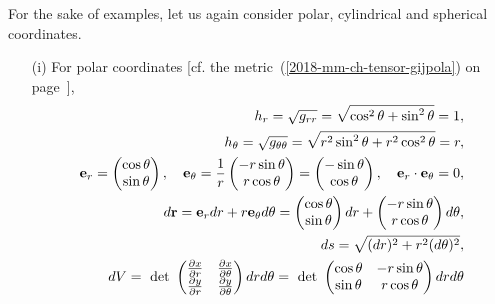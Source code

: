 {
\color{blue}
\bexample
For the sake of examples, let us again consider polar, cylindrical and spherical coordinates.
\begin{itemize}
\item[(i)]
For polar coordinates [cf. the metric~(\ref{2018-mm-ch-tensor-gijpola}) on page~\pageref{2018-mm-ch-tensor-gijpola}],
\begin{equation}
\begin{split}
h_r=\sqrt{g_{rr}}=\sqrt{ \cos^2\theta + \sin^2 \theta }=1,\\
h_\theta=\sqrt{g_{\theta \theta}}=\sqrt{ r^2 \sin^2\theta + r^2 \cos^2 \theta }=r, \\
{\bf e}_r =
\begin{pmatrix}
\cos \theta \\ \sin \theta
\end{pmatrix}
,\quad
{\bf e}_\theta = \frac{1}{r}
\begin{pmatrix}
- r \sin \theta \\ r \cos \theta
\end{pmatrix}
=
\begin{pmatrix}
- \sin \theta \\ \cos \theta
\end{pmatrix}
,\quad
{\bf e}_r \cdot {\bf e}_\theta = 0
,
\\
d{\bf r}= {\bf e}_r dr + r {\bf e}_\theta d \theta
=  \begin{pmatrix}
\cos \theta \\ \sin \theta
\end{pmatrix}  dr
+
\begin{pmatrix}
- r\sin \theta \\ r\cos \theta
\end{pmatrix} d \theta ,
\\
ds= \sqrt{ (dr)^2+ r^2 (d \theta )^2},
\\
dV
=\text{ det }
\begin{pmatrix}
\frac{\partial x}{\partial r} & \frac{\partial x}{\partial \theta} \\
\frac{\partial y}{\partial r} & \frac{\partial y}{\partial \theta} \\
\end{pmatrix}
dr d \theta
=\text{ det }
\begin{pmatrix}
\cos \theta &  -r \sin \theta  \\
\sin \theta & r \cos \theta  \\
\end{pmatrix}
dr d \theta
\\

\end{split}
\end{equation}
\end{itemize}}
